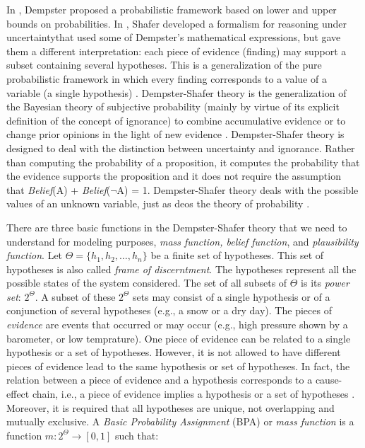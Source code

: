 \documentclass[11pt]{article}
\begin{document}
In \cite{dempster:theory}, Dempster proposed a probabilistic framework based on
lower and upper bounds on probabilities. In \cite{shafer:evidence-theory},
Shafer developed a formalism for reasoning under uncertaintythat used some of
Dempster's mathematical expressions, but gave them a different interpretation:
each piece of evidence (finding) may support a subset containing several
hypotheses. This is a generalization of the pure probabilistic framework in
which every finding corresponds to a value of a variable (a single hypothesis)
\cite{diez:reasoning-uncertainty}. Dempster-Shafer theory is the generalization
of the Bayesian theory of subjective probability (mainly by virtue of its
explicit definition of the concept of ignorance) to combine accumulative
evidence or to change prior opinions in the light of new evidence
\cite{das:decision-making-agents}. Dempster-Shafer theory is designed to deal
with the distinction between uncertainty and ignorance. Rather than computing
the probability of a proposition, it computes the probability that the evidence
supports the proposition \cite{russell:ai-modern} and it does not require the
assumption that \textit{Belief}(A) + \textit{Belief}($\neg$A) = 1. Dempster-Shafer
theory deals with the possible values of an unknown variable, just as deos the
theory of probability \cite{tanimoto:ai-lisp}. 

There are three basic functions in the Dempster-Shafer theory that we need to
understand for modeling purposes, \textit{mass function, belief function}, and
\textit{plausibility function}. Let $\Theta=\{h_1,h_2, \ldots, h_n\}$ be a
finite set of hypotheses. This set of hypotheses is also called \textit{frame of
discerntment}. The hypotheses represent all the possible states of the system
considered. The set of all subsets of $\Theta$ is its \textit{power set}:
$2^\Theta$. A subset of these $2^\Theta$ sets may consist of a single hypothesis
or of a conjunction of several hypotheses (e.g., a snow or a dry day). The
pieces of \textit{evidence} are events that occurred or may occur (e.g., high
pressure shown by a barometer, or low temprature). One piece of evidence can be
related to a single hypothesis or a set of hypotheses. However, it is not
allowed to have different pieces of evidence lead to the same hypothesis or set
of hypotheses. In fact, the relation between a piece of evidence and a
hypothesis corresponds to a cause-effect chain, i.e., a piece of evidence
implies a hypothesis or a set of hypotheses \cite{kay:dst-reliability}.
Moreover, it is required that all hypotheses are unique, not overlapping and
mutually exclusive. A \textit{Basic Probability Assignment} (BPA) or
\textit{mass function} is a function $m:2^\Theta\rightarrow[0,1]$ such that:\\
\end{document}
